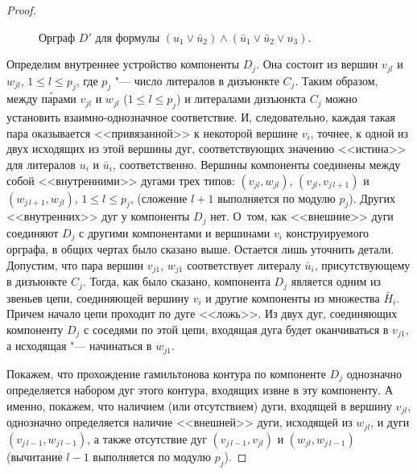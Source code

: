 \begin{proof}
\begin{figure}[tbh]
\caption{Орграф $D'$ для формулы $(u_1\vee\bar{u}_2)\wedge(\bar{u}_1\vee\bar{u}_2\vee u_3)$.}
\label{fig:SATTSP}
\end{figure}
	
Определим внутреннее устройство компоненты $D_j$.
Она состоит из вершин $v_{jl}$ и $w_{jl}$, $1\le l \le p_j$, где $p_j$ "--- число литералов в дизъюнкте $C_j$.
Таким образом, между п\'{а}рами $v_{jl}$ и $w_{jl}$ ($1\le l \le p_j$) и литералами дизъюнкта $C_j$ можно установить взаимно-однозначное соответствие.
И, следовательно, каждая такая пара оказывается <<привязанной>>	к некоторой вершине $v_i$, точнее, к одной из двух исходящих из этой вершины дуг, соответствующих значению <<истина>> для литералов $u_i$ и $\bar{u}_i$, соответственно. 
Вершины компоненты соединены между собой <<внутренними>> дугами	трех типов:
$(v_{j l}, w_{j l})$, $(v_{j l}, v_{j \, l+1})$ и $(w_{j \, l+1}, w_{j l})$, $1\le l \le p_j$, (сложение $l+1$ выполняется по модулю $p_j$).
Других <<внутренних>> дуг у компоненты $D_j$ нет.
О~том, как <<внешние>> дуги соединяют $D_j$ с другими компонентами и вершинами $v_i$ конструируемого орграфа, в общих чертах было сказано выше.
Остается лишь уточнить детали.
Допустим, что пара вершин $v_{j1}$, $w_{j1}$ соответствует литералу $\bar{u}_i$,
присутствующему в дизъюнкте $C_j$.
Тогда, как было сказано, компонента $D_j$ является одним из звеньев цепи, соединяющей	вершину $v_i$ и другие компоненты из множества $\bar{H}_i$.
Причем начало цепи проходит по дуге <<ложь>>.
Из двух дуг, соединяющих компоненту $D_j$ с соседями по этой цепи,
входящая дуга будет оканчиваться в $v_{j1}$, а исходящая "--- начинаться в $w_{j1}$.

Покажем, что прохождение гамильтонова контура по компоненте $D_j$ однозначно определяется набором дуг этого контура, входящих извне в эту компоненту.
А именно, покажем, что наличием (или отсутствием) дуги, входящей в вершину $v_{jl}$, однозначно определяется наличие <<внешней>> дуги, исходящей из $w_{jl}$, и дуги $(v_{j\,l-1}, w_{j\,l-1})$, а также отсутствие дуг $(v_{j \, l-1}, v_{j l})$ и $(w_{j l}, w_{j \, l-1})$ (вычитание $l-1$ выполняется по модулю $p_j$).


\end{proof}
